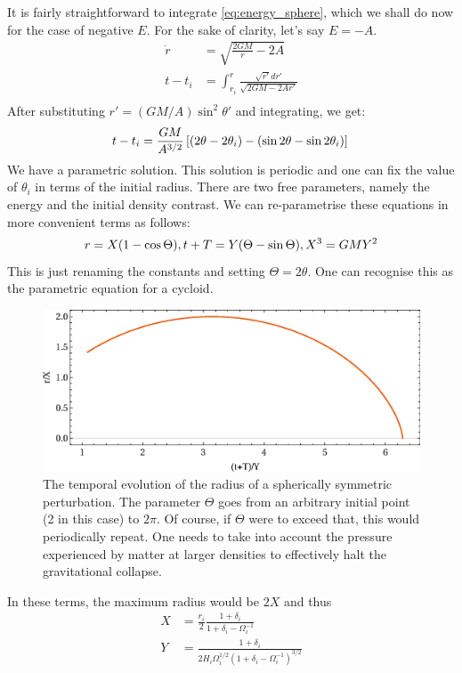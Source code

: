 \documentclass[12pt,a4paper,twoside]{book}
\begin{document}
		It is fairly straightforward to integrate \ref{eq:energy_sphere}, which we shall do now for the case of negative $E$. For the sake of clarity, let's say $E=-A$.
		$$
		\begin{aligned}
			\dot{r}&=\sqrt{\frac{2GM}{r}-2A}\\
			t-t_i&=\int_{r_i}^{r}\frac{\sqrt{r'}dr'}{\sqrt{2GM-2Ar'}}\\
		\end{aligned}
		$$
		After substituting $r'=(GM/A)\sin^2\theta'$ and integrating, we get:
		$$
			t-t_i=\frac{GM}{A^{3/2}}\left[(2\theta-2\theta_i)-(\sin2\theta-\sin2\theta_i)\right]\\
		$$
		We have a parametric solution. This solution is periodic and one can fix the value of $\theta_i$ in terms of the initial radius. There are two free parameters, namely the energy and the initial density contrast. We can re-parametrise these equations in more convenient terms as follows:
		$$
			r=X(1-\cos\Theta),t+T=Y(\Theta-\sin\Theta),X^3=GMY^2\\
		$$
		This is just renaming the constants and setting $\Theta=2\theta$. One can recognise this as the parametric equation for a cycloid. 
		\begin{figure}[h]
			\centering
			\includegraphics[width=\textwidth]{spherical.eps}
			\caption{\footnotesize The temporal evolution of the radius of a spherically symmetric perturbation. The parameter $\Theta$ goes from an arbitrary initial point (2 in this case) to $2\pi$. Of course, if $\Theta$ were to exceed that, this would periodically repeat. One needs to take into account the pressure experienced by matter at larger densities to effectively halt the gravitational collapse.}
			\label{fig:sphere-cycloid}
		\end{figure}
		
		In these terms, the maximum radius would be $2X$ and thus 
		$$
		\begin{aligned}
			X&=\frac{r_i}{2}\frac{1+\delta_i}{1+\delta_i-\Omega_i^{-1}}\\
			Y&=\frac{1+\delta_i}{2H_i\Omega_i^{1/2}	(1+\delta_i-\Omega_i^{-1})^{3/2}}
		\end{aligned}
		$$
\end{document}
